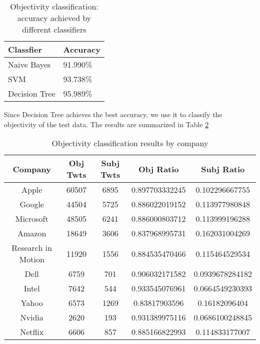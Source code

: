 \documentclass[12pt]{article}
\begin{document}
\begin{table}
\begin{center}
    \begin{tabular}{ | l || l | }
        \hline
        \textbf{Classfier} &  \textbf{Accuracy} \\ \hline
        \hline
        Naive Bayes &  91.990\% \\ \hline
        SVM & 93.738\% \\ \hline
        Decision Tree & 95.989\% \\ \hline
    \end{tabular}
\caption{Objectivity classification: accuracy achieved by different classifiers}
\label{classifiers-obj}
\end{center}
\end{table}

Since Decision Tree achieves the best accuracy, we use it to classify the objectivity of the test data. The results are summarized in Table \ref{objectivity-by-company}

\begin{table}
\begin{center}
    \begin{tabular}{ | c || c | c | c | c | }
        \hline
        \textbf{Company} &  \textbf{Obj Twts} & \textbf{Subj Twts} & \textbf{Obj Ratio} & \textbf{Subj Ratio} \\ \hline
        \hline
        Apple &  60507 & 6895 & 0.897703332245 & 0.102296667755 \\ \hline
        Google &  44504 & 5725 & 0.886022019152 & 0.113977980848 \\ \hline
        Microsoft &  48505 & 6241 & 0.886000803712 & 0.113999196288 \\ \hline
        Amazon &  18649 & 3606 & 0.837968995731 & 0.162031004269 \\ \hline
        Research in Motion  &  11920 & 1556 & 0.884535470466 & 0.115464529534 \\ \hline
        Dell &  6759 & 701 & 0.906032171582 & 0.0939678284182 \\ \hline
        Intel &  7642 & 544 & 0.933545076961 & 0.0664549230393 \\ \hline
        Yahoo &  6573 & 1269 & 0.83817903596 & 0.16182096404 \\ \hline
        Nvidia &  2620 & 193 & 0.931389975116 & 0.0686100248845 \\ \hline
        Netflix &  6606 & 857 & 0.885166822993 & 0.114833177007 \\ \hline
    \end{tabular}
\caption{Objectivity classification results by company}
\label{objectivity-by-company}
\end{center}
\end{table}
\end{document}
